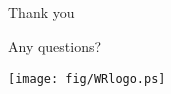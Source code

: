 \documentclass[compress,red]{beamer}
\begin{document}
\subsection{}
\begin{frame}{Thank you}

    \begin{center}
    Any questions?
    \end{center}

    
    \begin{center}
    \texttt{[image: fig/WRlogo.ps]}
    \end{center}

\end{frame}
\end{document}
